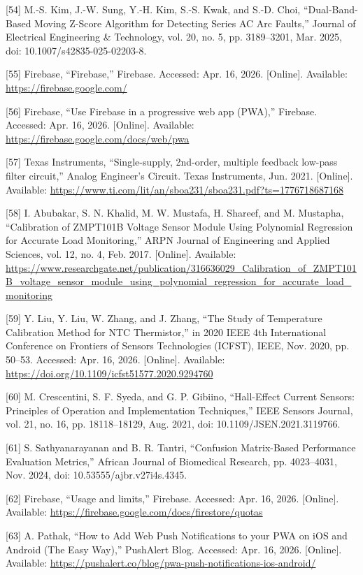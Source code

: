 \begin{thesisreferences}
{[}54{]} M.-S. Kim, J.-W. Sung, Y.-H. Kim, S.-S. Kwak, and S.-D. Choi,
``Dual-Band-Based Moving Z-Score Algorithm for Detecting Series AC Arc
Faults,'' Journal of Electrical Engineering \& Technology, vol. 20, no.
5, pp. 3189--3201, Mar. 2025, doi: 10.1007/s42835-025-02203-8.

{[}55{]} Firebase, ``Firebase,'' Firebase. Accessed: Apr. 16, 2026.
{[}Online{]}. Available:
\url{https://firebase.google.com/}

{[}56{]} Firebase, ``Use Firebase in a progressive web app (PWA),''
Firebase. Accessed: Apr. 16, 2026. {[}Online{]}. Available:
\url{https://firebase.google.com/docs/web/pwa}

{[}57{]} Texas Instruments, ``Single-supply, 2nd-order, multiple
feedback low-pass filter circuit,'' Analog Engineer's Circuit. Texas
Instruments, Jun. 2021. {[}Online{]}. Available:
\url{https://www.ti.com/lit/an/sboa231/sboa231.pdf?ts=1776718687168}

{[}58{]} I. Abubakar, S. N. Khalid, M. W. Mustafa, H. Shareef, and M.
Mustapha, ``Calibration of ZMPT101B Voltage Sensor Module Using
Polynomial Regression for Accurate Load Monitoring,'' ARPN Journal of
Engineering and Applied Sciences, vol. 12, no. 4, Feb. 2017.
{[}Online{]}. Available:
\url{https://www.researchgate.net/publication/316636029_Calibration_of_ZMPT101B_voltage_sensor_module_using_polynomial_regression_for_accurate_load_monitoring}

{[}59{]} Y. Liu, Y. Liu, W. Zhang, and J. Zhang, ``The Study of
Temperature Calibration Method for NTC Thermistor,'' in 2020 IEEE 4th
International Conference on Frontiers of Sensors Technologies (ICFST),
IEEE, Nov. 2020, pp. 50--53. Accessed: Apr. 16, 2026. {[}Online{]}.
Available:
\url{https://doi.org/10.1109/icfst51577.2020.9294760}

{[}60{]} M. Crescentini, S. F. Syeda, and G. P. Gibiino, ``Hall-Effect
Current Sensors: Principles of Operation and Implementation
Techniques,'' IEEE Sensors Journal, vol. 21, no. 16, pp. 18118--18129,
Aug. 2021, doi: 10.1109/JSEN.2021.3119766.

{[}61{]} S. Sathyanarayanan and B. R. Tantri, ``Confusion Matrix-Based
Performance Evaluation Metrics,'' African Journal of Biomedical
Research, pp. 4023--4031, Nov. 2024, doi: 10.53555/ajbr.v27i4s.4345.

{[}62{]} Firebase, ``Usage and limits,'' Firebase. Accessed: Apr. 16,
2026. {[}Online{]}. Available:
\url{https://firebase.google.com/docs/firestore/quotas}

{[}63{]} A. Pathak, ``How to Add Web Push Notifications to your PWA on
iOS and Android (The Easy Way),'' PushAlert Blog. Accessed: Apr. 16,
2026. {[}Online{]}. Available:
\url{https://pushalert.co/blog/pwa-push-notifications-ios-android/}


\end{thesisreferences}
